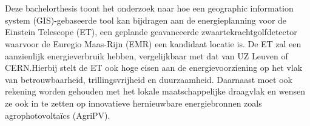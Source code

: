 
%
%
%
%
%

%



\chapter*{}

Deze bachelorthesis toont het onderzoek naar hoe een geographic information system (GIS)-gebaseerde tool kan bijdragen aan de energieplanning voor de Einstein Telescope (ET), een geplande geavanceerde zwaartekrachtgolfdetector waarvoor de Euregio Maas-Rijn (EMR) een kandidaat locatie is. De ET zal een aanzienlijk energieverbruik hebben, vergelijkbaar met dat van UZ Leuven of CERN.\@ Hierbij stelt de ET ook hoge eisen aan de energievoorziening op het vlak van betrouwbaarheid, trillingsvrijheid en duurzaamheid. Daarnaast moet ook rekening worden gehouden met het lokale maatschappelijke draagvlak en wensen ze ook in te zetten op innovatieve hernieuwbare energiebronnen zoals agrophotovoltaïcs (AgriPV).\medskip

